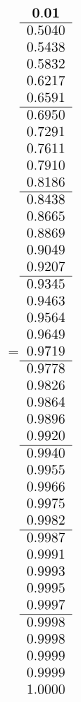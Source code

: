 =\hbox{$\begin{array}{c}
\bf 0.01 
 \\ \hline 
  0.5040 \\ 
  0.5438 \\ 
  0.5832 \\ 
  0.6217 \\ 
  0.6591
 \\ \hline 
  0.6950 \\ 
  0.7291 \\ 
  0.7611 \\ 
  0.7910 \\ 
  0.8186
 \\ \hline 
  0.8438 \\ 
  0.8665 \\ 
  0.8869 \\ 
  0.9049 \\ 
  0.9207
 \\ \hline 
  0.9345 \\ 
  0.9463 \\ 
  0.9564 \\ 
  0.9649 \\ 
  0.9719
 \\ \hline 
  0.9778 \\ 
  0.9826 \\ 
  0.9864 \\ 
  0.9896 \\ 
  0.9920
 \\ \hline 
  0.9940 \\ 
  0.9955 \\ 
  0.9966 \\ 
  0.9975 \\ 
  0.9982
 \\ \hline 
  0.9987 \\ 
  0.9991 \\ 
  0.9993 \\ 
  0.9995 \\ 
  0.9997
 \\ \hline 
  0.9998 \\ 
  0.9998 \\ 
  0.9999 \\ 
  0.9999 \\ 
  1.0000
 \end{array}$}
